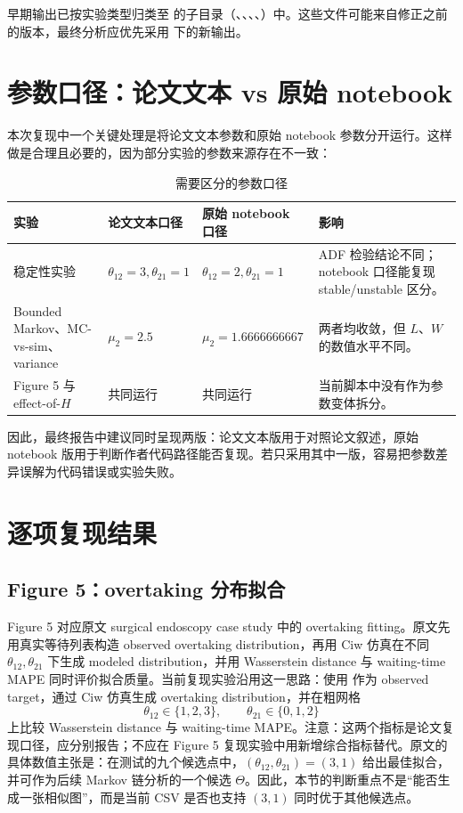 \documentclass[UTF8,a4paper,11pt]{ctexart}
\begin{document}
早期输出已按实验类型归类至  的子目录（、、、、）中。这些文件可能来自修正之前的版本，最终分析应优先采用  下的新输出。

\section{参数口径：论文文本 vs 原始 notebook}

本次复现中一个关键处理是将论文文本参数和原始 notebook 参数分开运行。这样做是合理且必要的，因为部分实验的参数来源存在不一致：

\begin{table}[H]
\centering
\caption{需要区分的参数口径}
\begin{tabularx}{\textwidth}{@{}p{}p{}p{}X@{}}
\toprule
实验 & 论文文本口径 & 原始 notebook 口径 & 影响 \\
\midrule
稳定性实验 & $\theta_{12}=3,\theta_{21}=1$ & $\theta_{12}=2,\theta_{21}=1$ & ADF 检验结论不同；notebook 口径能复现 stable/unstable 区分。\\
Bounded Markov、MC-vs-sim、variance & $\mu_2=2.5$ & $\mu_2=1.6666666667$ & 两者均收敛，但 $L$、$W$ 的数值水平不同。\\
Figure 5 与 effect-of-$H$ & 共同运行 & 共同运行 & 当前脚本中没有作为参数变体拆分。\\
\bottomrule
\end{tabularx}
\end{table}

因此，最终报告中建议同时呈现两版：论文文本版用于对照论文叙述，原始 notebook 版用于判断作者代码路径能否复现。若只采用其中一版，容易把参数差异误解为代码错误或实验失败。

\section{逐项复现结果}

\subsection{Figure 5：overtaking 分布拟合}

Figure 5 对应原文 surgical endoscopy case study 中的 overtaking fitting。原文先用真实等待列表构造 observed overtaking distribution，再用 Ciw 仿真在不同 $\theta_{12},\theta_{21}$ 下生成 modeled distribution，并用 Wasserstein distance 与 waiting-time MAPE 同时评价拟合质量。当前复现实验沿用这一思路：使用  作为 observed target，通过 Ciw 仿真生成 overtaking distribution，并在粗网格
\[
  \theta_{12}\in\{1,2,3\},\qquad \theta_{21}\in\{0,1,2\}
\]
上比较 Wasserstein distance 与 waiting-time MAPE。注意：这两个指标是论文复现口径，应分别报告；不应在 Figure 5 复现实验中用新增综合指标替代。原文的具体数值主张是：在测试的九个候选点中，$(\theta_{12},\theta_{21})=(3,1)$ 给出最佳拟合，并可作为后续 Markov 链分析的一个候选 $\Theta$。因此，本节的判断重点不是“能否生成一张相似图”，而是当前 CSV 是否也支持 $(3,1)$ 同时优于其他候选点。
\end{document}
